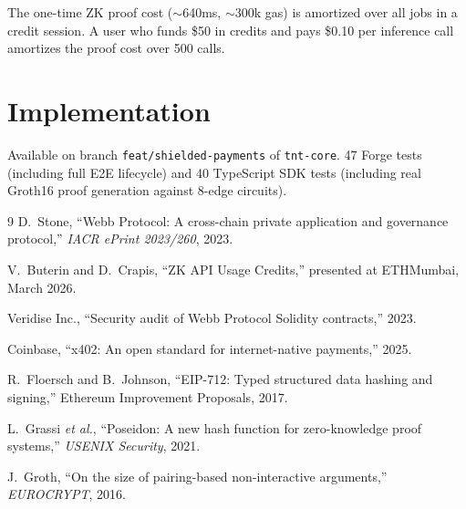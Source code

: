 \documentclass[11pt,a4paper]{article}
\theoremstyle{definition}
\begin{document}
The one-time ZK proof cost ($\sim$640ms, $\sim$300k gas) is amortized over all jobs in a credit session. A user who funds \$50 in credits and pays \$0.10 per inference call amortizes the proof cost over 500 calls.

\section{Implementation}

Available on branch \texttt{feat/shielded-payments} of \texttt{tnt-core}. 47 Forge tests (including full E2E lifecycle) and 40 TypeScript SDK tests (including real Groth16 proof generation against 8-edge circuits).

\begin{thebibliography}{9}
 D.~Stone, ``Webb Protocol: A cross-chain private application and governance protocol,'' \emph{IACR ePrint 2023/260}, 2023.

 V.~Buterin and D.~Crapis, ``ZK API Usage Credits,'' presented at ETHMumbai, March 2026.

 Veridise Inc., ``Security audit of Webb Protocol Solidity contracts,'' 2023.

 Coinbase, ``x402: An open standard for internet-native payments,'' 2025.

 R.~Floersch and B.~Johnson, ``EIP-712: Typed structured data hashing and signing,'' Ethereum Improvement Proposals, 2017.

 L.~Grassi \emph{et al.}, ``Poseidon: A new hash function for zero-knowledge proof systems,'' \emph{USENIX Security}, 2021.

 J.~Groth, ``On the size of pairing-based non-interactive arguments,'' \emph{EUROCRYPT}, 2016.
\end{thebibliography}
\end{document}
